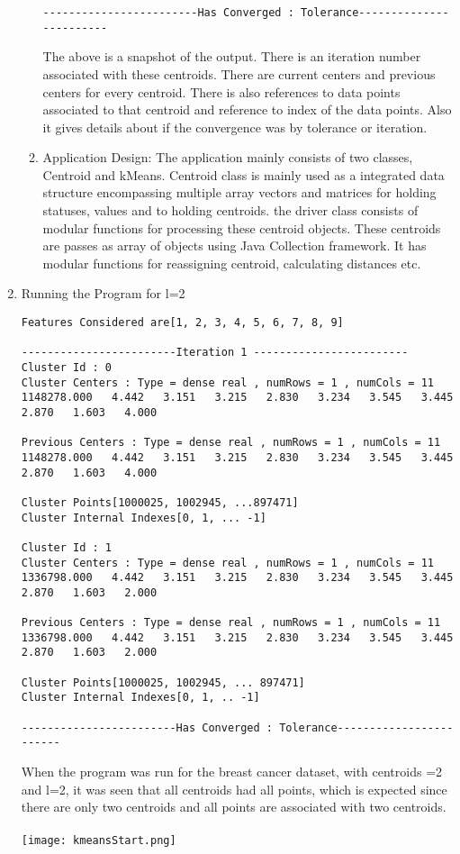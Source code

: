 \documentclass{article}
\begin{document}
\begin{enumerate}
\begin{enumerate}
\begin{verbatim}
------------------------Has Converged : Tolerance------------------------
\end{verbatim}
The above is a snapshot of the output. There is an iteration number associated with these centroids. There are current centers and previous centers for every centroid. There is also references to data points associated to that centroid and reference to index of the data points. Also it gives details about if the convergence was by tolerance or iteration.
\item Application Design: The application mainly consists of two classes, Centroid and kMeans. Centroid class is mainly used as a integrated data structure encompassing multiple array vectors and matrices for holding statuses, values and to holding centroids. the driver class consists of modular functions for processing these centroid objects. These centroids are passes as array of objects using Java Collection framework. It has modular functions for reassigning centroid, calculating distances etc.
\end{enumerate}
\item Running the Program for l=2
\begin{verbatim}
Features Considered are[1, 2, 3, 4, 5, 6, 7, 8, 9]

------------------------Iteration 1 ------------------------
Cluster Id : 0
Cluster Centers : Type = dense real , numRows = 1 , numCols = 11
1148278.000   4.442   3.151   3.215   2.830   3.234   3.545   3.445   2.870   1.603   4.000  

Previous Centers : Type = dense real , numRows = 1 , numCols = 11
1148278.000   4.442   3.151   3.215   2.830   3.234   3.545   3.445   2.870   1.603   4.000  

Cluster Points[1000025, 1002945, ...897471]
Cluster Internal Indexes[0, 1, ... -1]

Cluster Id : 1
Cluster Centers : Type = dense real , numRows = 1 , numCols = 11
1336798.000   4.442   3.151   3.215   2.830   3.234   3.545   3.445   2.870   1.603   2.000  

Previous Centers : Type = dense real , numRows = 1 , numCols = 11
1336798.000   4.442   3.151   3.215   2.830   3.234   3.545   3.445   2.870   1.603   2.000  

Cluster Points[1000025, 1002945, ... 897471]
Cluster Internal Indexes[0, 1, .. -1]

------------------------Has Converged : Tolerance------------------------
\end{verbatim}
When the program was run for the breast cancer dataset, with centroids =2 and l=2, it was seen that all centroids had all points, which is expected since there are only two centroids and all points are associated with two centroids.\\ \\
\texttt{[image: kmeansStart.png]}\\
\end{enumerate}
\end{document}
